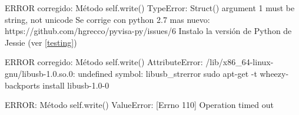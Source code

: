 \documentclass[a4paper]{article}
\begin{document}
ERROR corregido: Método self.write()
TypeError: Struct() argument 1 must be string, not unicode
Se corrige con python 2.7 mas nuevo: https://github.com/hgrecco/pyvisa-py/issues/6
Instalo la versión de Python de Jessie (ver \ref{testing})

ERROR corregido: Método self.write()
AttributeError: /lib/x86_64-linux-gnu/libusb-1.0.so.0: undefined symbol: libusb_strerror
sudo apt-get -t wheezy-backports install libusb-1.0-0

ERROR: Método self.write()
ValueError: [Errno 110] Operation timed out
\end{document}
